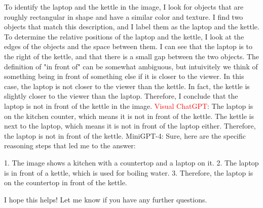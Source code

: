 \begin{enumerate}
    To identify the laptop and the kettle in the image, I look for objects that are roughly rectangular in shape and have a similar color and texture. I find two objects that match this description, and I label them as the laptop and the kettle.
    To determine the relative positions of the laptop and the kettle, I look at the edges of the objects and the space between them. I can see that the laptop is to the right of the kettle, and that there is a small gap between the two objects.
    The definition of "in front of" can be somewhat ambiguous, but intuivitely we think of something being in front of something else if it is closer to the viewer. In this case, the laptop is not closer to the viewer than the kettle. In fact, the kettle is slightly closer to the viewer than the laptop.
    Therefore, I conclude that the laptop is not in front of the kettle in the image.
    \subitem \textcolor{red}{Visual ChatGPT}: The laptop is on the kitchen counter, which means it is not in front of the kettle. The kettle is next to the laptop, which means it is not in front of the laptop either. Therefore, the laptop is not in front of the kettle.
    \subitem MiniGPT-4: Sure, here are the specific reasoning steps that led me to the answer:

    1. The image shows a kitchen with a countertop and a laptop on it.
    2. The laptop is in front of a kettle, which is used for boiling water.
    3. Therefore, the laptop is on the countertop in front of the kettle.
    
    I hope this helps! Let me know if you have any further questions.
\end{enumerate}
